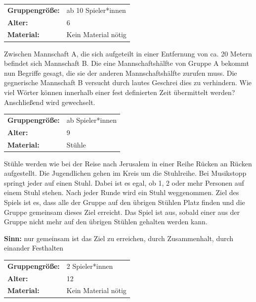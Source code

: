 \begin{table}[H]
\begin{tabular}{>{\bfseries}lp{8cm}}
   Gruppengröße:   & ab 10 Spieler*innen\\
    Alter: & 6 \\
    Material: & Kein Material nötig \\ 
\end{tabular}
\end{table} 
Zwischen Mannschaft A, die sich aufgeteilt in einer Entfernung von ca. 20 Metern befindet sich Mannschaft B. Die eine Mannschaftshälfte von Gruppe A bekommt nun Begriffe gesagt, die sie der anderen Mannschaftshälfte zurufen muss. Die gegnerische Mannschaft B versucht durch lautes Geschrei dies zu verhindern. Wie viel Wörter können innerhalb einer fest definierten Zeit übermittelt werden? Anschließend wird gewechselt.

\begin{table}[H]
\begin{tabular}{>{\bfseries}lp{8cm}}
   Gruppengröße:   & ab Spieler*innen\\
    Alter: & 9 \\
    Material: & Stühle \\ 
\end{tabular}
\end{table} 

Stühle werden wie bei der Reise nach Jerusalem in einer Reihe Rücken an Rücken aufgestellt. Die Jugendlichen gehen im Kreis um die Stuhlreihe. Bei Musikstopp springt jeder auf einen Stuhl. Dabei ist es egal, ob 1, 2 oder mehr Personen auf einem Stuhl stehen. Nach jeder Runde wird ein Stuhl weggenommen. Ziel des Spiels ist es, dass alle der Gruppe auf den übrigen Stühlen Platz finden und die Gruppe gemeinsam dieses Ziel erreicht. Das Spiel ist aus, sobald einer aus der Gruppe nicht mehr auf den übrigen Stühlen gehalten werden kann.

\textbf{Sinn:} nur gemeinsam ist das Ziel zu erreichen, durch Zusammenhalt, durch einander Festhalten

\begin{table}[H]
\begin{tabular}{>{\bfseries}lp{8cm}}
   Gruppengröße:   & 2 Spieler*innen\\
    Alter: & 12 \\
    Material: & Kein Material nötig \\ 
\end{tabular}
\end{table} 


